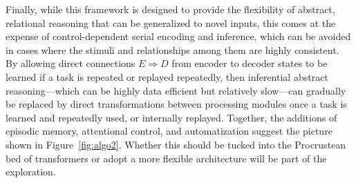 Finally, while this framework is designed to provide the flexibility of abstract, relational reasoning that can be generalized to novel inputs, this comes at the expense of control-dependent serial encoding and inference, which can be avoided in cases where the stimuli and relationships among them are highly consistent. By allowing
direct connections $E \Rightarrow D$ from encoder to decoder states to be learned if a task is repeated or replayed repeatedly, then inferential abstract reasoning---which can be highly data efficient but relatively slow---can gradually be replaced by direct transformations between processing modules once a task is learned and repeatedly used, or internally replayed.  Together, the additions of episodic memory, attentional control, and automatization 
suggest the picture shown in Figure~\ref{fig:algo2}. Whether this should be tucked into the Procrustean bed of transformers or adopt a more flexible architecture will be part of the exploration.



